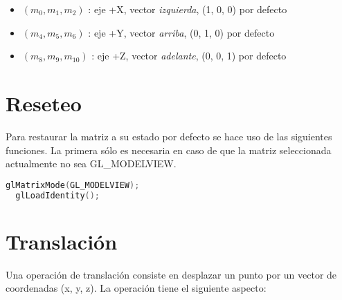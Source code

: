 \begin{itemize}
\item{\((m_0, m_1, m_2)\) : eje +X, vector \textit{izquierda}, (1, 0, 0) por defecto}
\item{\((m_4, m_5, m_6)\) : eje +Y, vector \textit{arriba}, (0, 1, 0) por defecto}
\item{\((m_8, m_9, m_{10})\) : eje +Z, vector \textit{adelante}, (0, 0, 1) por defecto}
\end{itemize}

\section{Reseteo}
Para restaurar la matriz a su estado por defecto se hace uso de las siguientes funciones. La primera sólo es necesaria en caso de que la matriz seleccionada actualmente no sea GL\_MODELVIEW.
\begin{lstlisting}[language=C]
  glMatrixMode(GL_MODELVIEW);
  glLoadIdentity();
\end{lstlisting}

\section{Translación}
Una operación de translación consiste en desplazar un punto por un vector de coordenadas (x, y, z). La operación tiene el siguiente aspecto:

